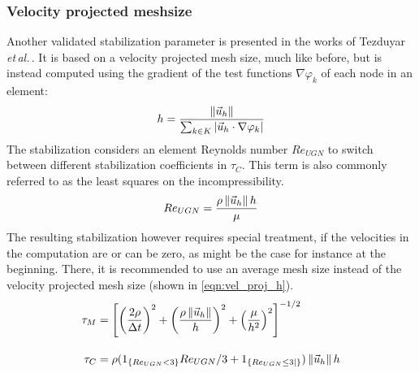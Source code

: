 \subsubsection*{Velocity projected meshsize}
Another validated stabilization parameter is presented in the works of Tezduyar \textit{et\,al.}\,\cite{Tezduyar1986, Tezduyar2000}. It is based on a velocity projected mesh size, much like before, but is instead computed using the gradient of the test functions $\nabla \varphi_k$ of each node in an element:
\begin{equation}
	h = \frac{\left\lVert\vec{u}_h\right\rVert}{\sum_{k\in K} \left| \vec{u}_h \cdot \nabla \varphi_k \right|}
	\label{eqn:vel_proj_h}
\end{equation}
The stabilization considers an element Reynolds number $Re_{UGN}$ to switch between different stabilization coefficients in $\tau_C$. This term is also commonly referred to as the least squares on the incompressibility.
\begin{equation*}
	Re_{UGN} = \frac{\rho\left\lVert\vec{u}_h\right\rVert h}{\mu}
\end{equation*}
The resulting stabilization however requires special treatment, if the velocities in the computation are or can be zero, as might be the case for instance at the beginning. There, it is recommended to use an average mesh size instead of the velocity projected mesh size (shown in \autoref{eqn:vel_proj_h}).
\begin{equation*}
	\begin{split}
		\tau_M &= \left[\left(\frac{2\rho}{\Delta t}\right)^2 + \left(\frac{\rho\left\lVert\vec{u}_h\right\rVert}{h}\right)^2 + \left(\frac{\mu}{h^2}\right)^2\right]^{-1/2}\\[1em]
		\tau_C &= \rho(1_{\{Re_{UGN} < 3\}}Re_{UGN}/3 + 1_{\{Re_{UGN} \leq 3|\}}) \left\lVert\vec{u}_h\right\rVert h
	\end{split}
\end{equation*}

